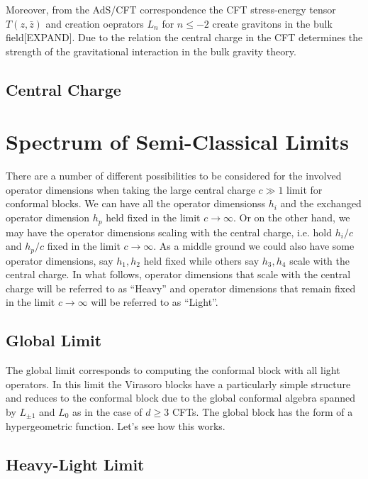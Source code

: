   Moreover, from the AdS/CFT correspondence the CFT stress-energy tensor $T(z,\bar{z})$ and creation oeprators $L_n$ for $n \leq -2$ create gravitons in the bulk field[EXPAND]. Due to the relation \cite{central} the central charge in the CFT determines the strength of the gravitational interaction in the bulk gravity theory. 
  \subsection{Central Charge}

  \section{Spectrum of Semi-Classical Limits}
  There are a number of different possibilities to be considered for the involved operator dimensions when taking the large central charge $c \gg 1$ limit for conformal blocks. We can have all the operator dimensionss $h_i$ and the exchanged operator dimension $h_p$ held fixed in the limit $c\to \infty$. Or on the other hand, we may have the operator dimensions scaling with the central charge, i.e. hold $h_i/c$ and $h_p/c$ fixed in the limit $c \to \infty$. As a middle ground we could also have some operator dimensions, say $h_1, h_2$ held fixed while others say $h_3, h_4$ scale with the central charge. In what follows, operator dimensions that scale with the central charge will be referred to as ``Heavy'' and operator dimensions that remain fixed in the limit $c \to \infty$ will be referred to as ``Light''.
  \subsection{Global Limit}
  
  The global limit corresponds to computing the conformal block with all light operators. In this limit the Virasoro blocks have a particularly simple structure and reduces to the conformal block due to the global conformal algebra spanned by $L_{\pm 1}$ and $L_0$ as in the case of $d \geq 3$ CFTs\cite{Fitzpatrick:2015zha}. The global block has the form of a hypergeometric function. Let's see how this works.
  
  
  
  \subsection{Heavy-Light Limit}
  
